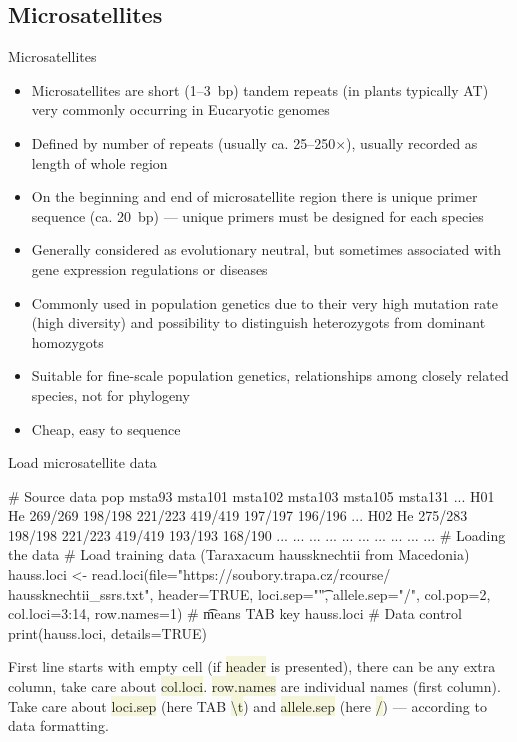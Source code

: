 \documentclass[compress, ucs, xelatex, 11pt, xcolor=svgnames, aspectratio=169,
	hyperref={
		bookmarks=true,
		unicode=true,
		colorlinks=true,
		pdftitle={Molecular data in R},
		plainpages=false,
		pdfauthor={Vojtech Zeisek},
		pdfsubject={Course about phylogeny and evolution in R},
		pdfcreator={XeLaTeX},
		pdfkeywords={R, evolution, phylogeny, molecular data},
		linkcolor=Crimson, %
		anchorcolor=Magenta, %
		citecolor=Magenta, %
		filecolor=Magenta, %
		menucolor=Magenta, %
		urlcolor=DodgerBlue, %
		pdftex},
	url={hyphens, lowtilde} %
	]{beamer}
\renewcommand{\texttt}[1]{\colorbox{Beige}{{\ttfamily #1}}}
\begin{document}
\subsection{Microsatellites}

\begin{frame}{Microsatellites}
	\begin{itemize}
		\item Microsatellites are short (1--3~bp) tandem repeats (in plants typically AT) very commonly occurring in Eucaryotic genomes
		\item Defined by number of repeats (usually ca. 25--250$\times$), usually recorded as length of whole region
		\item On the beginning and end of microsatellite region there is unique primer sequence (ca. 20~bp) --- unique primers must be designed for each species
		\item Generally considered as evolutionary neutral, but sometimes associated with gene expression regulations or diseases
		\item Commonly used in population genetics due to their very high mutation rate (high diversity) and possibility to distinguish heterozygots from dominant homozygots
		\item Suitable for fine-scale population genetics, relationships among closely related species, not for phylogeny
		\item Cheap, easy to sequence
	\end{itemize}
\end{frame}

\begin{frame}[fragile]{Load microsatellite data}
	\begin{spluscode}
    # Source data
        pop  msta93 msta101 msta102 msta103 msta105 msta131 ...
    H01  He 269/269 198/198 221/223 419/419 197/197 196/196 ...
    H02  He 275/283 198/198 221/223 419/419 193/193 168/190 ...
    ... ...     ...     ...     ...     ...     ...     ... ...
    # Loading the data
    # Load training data (Taraxacum haussknechtii from Macedonia)
    hauss.loci <- read.loci(file="https://soubory.trapa.cz/rcourse/
      haussknechtii_ssrs.txt", header=TRUE, loci.sep="\t", allele.sep="/",
      col.pop=2, col.loci=3:14, row.names=1) # \t means TAB key
    hauss.loci # Data control
    print(hauss.loci, details=TRUE)
	\end{spluscode}
	\vfill
	\begin{footnotesize}
		First line starts with empty cell (if \texttt{header} is presented), there can be any extra column, take care about \texttt{col.loci}. \texttt{row.names} are individual names (first column). Take care about \texttt{loci.sep} (here TAB \texttt{\textbackslash t}) and \texttt{allele.sep} (here \texttt{/}) --- \alert{according to data formatting}.
	\end{footnotesize}
	\vfill
\end{frame}
\end{document}
